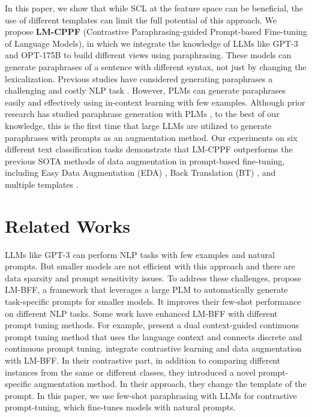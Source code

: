 \documentclass[11pt]{article}
\begin{document}
In this paper, we show that while SCL at the feature space can be beneficial, the use of different templates can limit the full potential of this approach. We propose \textbf{LM-CPPF} (Contrastive Paraphrasing-guided Prompt-based Fine-tuning of Language Models), in which we integrate the knowledge of LLMs like GPT-3 and OPT-175B \cite{zhang2022opt} to build different views using paraphrasing. These models can generate paraphrases of a sentence with different syntax, not just by changing the lexicalization. Previous studies have considered generating paraphrases a challenging and costly NLP task \cite{siddique2020unsupervised, garg2021unsupervised, zhou2021paraphrase}. However, PLMs can generate paraphrases easily and effectively using in-context learning with few examples. Although prior research has studied paraphrase generation with PLMs \cite{roy2019unsupervised, hegde2020unsupervised}, to the best of our knowledge, this is the first time that large LLMs are utilized to generate paraphrases with prompts as an augmentation method. Our experiments on six different text classification tasks demonstrate that LM-CPPF outperforms the previous SOTA methods of data augmentation in prompt-based fine-tuning, including Easy Data Augmentation (EDA) \cite{wei2019eda}, Back Translation (BT) \cite{sugiyama2019data}, and multiple templates \cite{jian-etal-2022-contrastive}.

\section{Related Works}
\label{sec:realted-works}

LLMs like GPT-3 \cite{brown2020language} can perform NLP tasks with few examples and natural prompts. But smaller models are not efficient with this approach and there are data sparsity and prompt sensitivity issues. To address these challenges,  propose LM-BFF, a framework that leverages a large PLM to automatically generate task-specific prompts for smaller models. It improves their few-shot performance on different NLP tasks. Some work have enhanced LM-BFF with different prompt tuning methods. For example,  present a dual context-guided continuous prompt tuning method that uses the language context and connects discrete and continuous prompt tuning.  integrate contrastive learning and data augmentation with LM-BFF. In their contrastive part, in addition to comparing different instances from the same or different classes, they introduced a novel prompt-specific augmentation method. In their approach, they change the template of the prompt. In this paper, we use few-shot paraphrasing with LLMs for contrastive prompt-tuning, which fine-tunes models with natural prompts.
\end{document}
